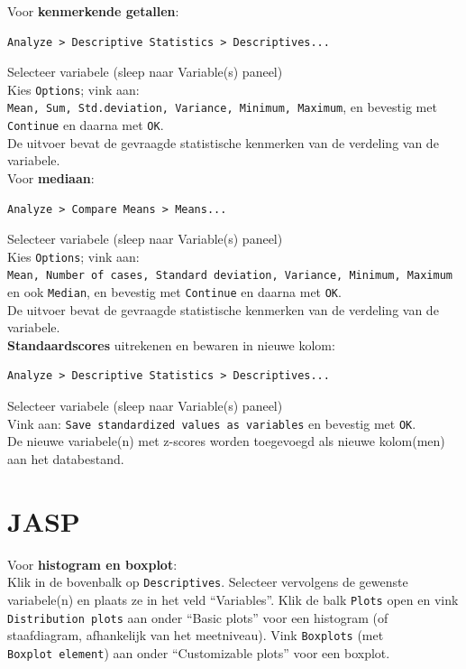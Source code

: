 \documentclass[
]{book}
\begin{document}
Voor \textbf{kenmerkende getallen}:\\

\begin{verbatim}
Analyze > Descriptive Statistics > Descriptives...
\end{verbatim}

Selecteer variabele (sleep naar Variable(s) paneel)\\
Kies \texttt{Options}; vink aan:
\texttt{Mean,\ Sum,\ Std.deviation,\ Variance,\ Minimum,\ Maximum}, en bevestig met
\texttt{Continue} en daarna met \texttt{OK}.\\
De uitvoer bevat de gevraagde statistische kenmerken van de verdeling
van de variabele.\\

Voor \textbf{mediaan}:\\

\begin{verbatim}
Analyze > Compare Means > Means...
\end{verbatim}

Selecteer variabele (sleep naar Variable(s) paneel)\\
Kies \texttt{Options}; vink aan:
\texttt{Mean,\ Number\ of\ cases,\ Standard\ deviation,\ Variance,\ Minimum,\ Maximum}
en ook \texttt{Median}, en bevestig met \texttt{Continue} en daarna met \texttt{OK}.\\
De uitvoer bevat de gevraagde statistische kenmerken van de verdeling
van de variabele.\\

\textbf{Standaardscores} uitrekenen en bewaren in nieuwe kolom:\\

\begin{verbatim}
Analyze > Descriptive Statistics > Descriptives...
\end{verbatim}

Selecteer variabele (sleep naar Variable(s) paneel)\\
Vink aan: \texttt{Save\ standardized\ values\ as\ variables} en bevestig met \texttt{OK}.\\
De nieuwe variabele(n) met z-scores worden toegevoegd als nieuwe
kolom(men) aan het databestand.\\

\section{JASP}\label{jasp-3}

Voor \textbf{histogram en boxplot}:\\
Klik in de bovenbalk op \texttt{Descriptives}. Selecteer vervolgens de gewenste variabele(n) en plaats ze in het veld ``Variables''. Klik de balk \texttt{Plots} open en vink \texttt{Distribution\ plots} aan onder ``Basic plots'' voor een histogram (of staafdiagram, afhankelijk van het meetniveau). Vink \texttt{Boxplots} (met \texttt{Boxplot\ element}) aan onder ``Customizable plots'' voor een boxplot.
\end{document}

